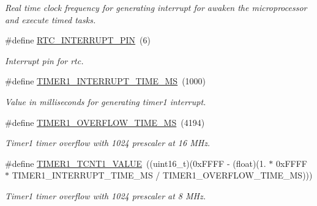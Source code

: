 \begin{DoxyCompactItemize}
\begin{DoxyCompactList}\small\item\em Real time clock frequency for generating interrupt for awaken the microprocessor and execute timed tasks. \end{DoxyCompactList}\item 
\mbox{\label{rmap-config_8h_a1efb928882c9a9d83d78e499091a8319}} 
\#define \hyperlink{rmap-config_8h_a1efb928882c9a9d83d78e499091a8319}{R\+T\+C\+\_\+\+I\+N\+T\+E\+R\+R\+U\+P\+T\+\_\+\+P\+IN}~(6)
\begin{DoxyCompactList}\small\item\em Interrupt pin for rtc. \end{DoxyCompactList}\item 
\mbox{\label{rmap-config_8h_a42354f9347cc2a67e00dd79c5da40833}} 
\#define \hyperlink{rmap-config_8h_a42354f9347cc2a67e00dd79c5da40833}{T\+I\+M\+E\+R1\+\_\+\+I\+N\+T\+E\+R\+R\+U\+P\+T\+\_\+\+T\+I\+M\+E\+\_\+\+MS}~(1000)
\begin{DoxyCompactList}\small\item\em Value in milliseconds for generating timer1 interrupt. \end{DoxyCompactList}\item 
\mbox{\label{rmap-config_8h_aa4674bad300dfeeb4b9479c5bdc21036}} 
\#define \hyperlink{rmap-config_8h_aa4674bad300dfeeb4b9479c5bdc21036}{T\+I\+M\+E\+R1\+\_\+\+O\+V\+E\+R\+F\+L\+O\+W\+\_\+\+T\+I\+M\+E\+\_\+\+MS}~(4194)
\begin{DoxyCompactList}\small\item\em Timer1 timer overflow with 1024 prescaler at 16 M\+Hz. \end{DoxyCompactList}\item 
\mbox{\label{rmap-config_8h_a346c738fa798abcc0c070d068da6380f}} 
\#define \hyperlink{rmap-config_8h_a346c738fa798abcc0c070d068da6380f}{T\+I\+M\+E\+R1\+\_\+\+T\+C\+N\+T1\+\_\+\+V\+A\+L\+UE}~((uint16\+\_\+t)(0x\+F\+F\+F\+F -\/ (float)(1. $\ast$ 0x\+F\+F\+F\+F $\ast$ T\+I\+M\+E\+R1\+\_\+\+I\+N\+T\+E\+R\+R\+U\+P\+T\+\_\+\+T\+I\+M\+E\+\_\+\+M\+S / T\+I\+M\+E\+R1\+\_\+\+O\+V\+E\+R\+F\+L\+O\+W\+\_\+\+T\+I\+M\+E\+\_\+\+M\+S)))
\begin{DoxyCompactList}\small\item\em Timer1 timer overflow with 1024 prescaler at 8 M\+Hz. \end{DoxyCompactList}\item 

\end{DoxyCompactItemize}
